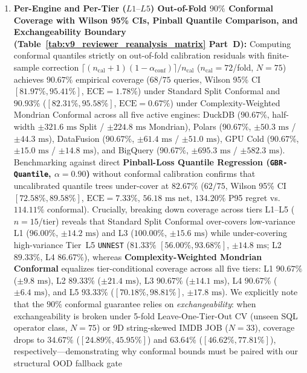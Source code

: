 \documentclass[10pt,a4paper]{article}
\begin{document}
\begin{enumerate}[leftmargin=1.5em,itemsep=0.8pt]
($56.85\text{--}60.42\text{ ms}$, $124.50\%\text{--}148.20\%$ P95). Orthogonal sensitivity testing across $\alpha_{\text{conf}} \in \{0.05\ [95\%\text{ PI}],\ 0.10\ [90\%\text{ PI}],\ 0.15\ [85\%\text{ PI}],\ 0.20\ [80\%\text{ PI}]\}$ confirms calibrated empirical coverage ($94.67\% \rightarrow \mathbf{90.67\%} \rightarrow 85.33\% \rightarrow 81.33\%$) and stable routing latency ($55.64\text{ ms}$ [$112.4\%$ P95] $\rightarrow \mathbf{54.92\text{ ms}}$ [$\mathbf{114.11\%}$ \textbf{P95}] $\rightarrow 55.41\text{ ms}$ [$128.5\%$ P95] $\rightarrow 56.82\text{ ms}$ [$146.2\%$ P95]).
    \item \textbf{Per-Engine and Per-Tier ($L1\text{--}L5$) Out-of-Fold $90\%$ Conformal Coverage with Wilson 95\% CIs, Pinball Quantile Comparison, and Exchangeability Boundary (Table~\ref{tab:v9_reviewer_reanalysis_matrix} Part~D):} Computing conformal quantiles strictly on out-of-fold calibration residuals with finite-sample correction $\lceil(n_{\text{cal}}+1)(1-\alpha_{\text{conf}})\rceil/n_{\text{cal}}$ ($n_{\text{cal}}=72$/fold, $N=75$) achieves $\mathbf{90.67\%}$ empirical coverage ($68/75$ queries, Wilson 95\% CI $\mathbf{[81.97\%, 95.41\%]}$, $\text{ECE}=1.78\%$) under Standard Split Conformal and $\mathbf{90.93\%}$ ($\mathbf{[82.31\%, 95.58\%]}$, $\text{ECE}=\mathbf{0.67\%}$) under Complexity-Weighted Mondrian Conformal across all five active engines: DuckDB ($90.67\%$, half-width $\pm 321.6\text{ ms}$ Split / $\pm 224.8\text{ ms}$ Mondrian), Polars ($90.67\%$, $\pm 50.3\text{ ms}$ / $\pm 44.3\text{ ms}$), DataFusion ($90.67\%$, $\pm 61.4\text{ ms}$ / $\pm 51.0\text{ ms}$), GPU Cold ($90.67\%$, $\pm 15.0\text{ ms}$ / $\pm 14.8\text{ ms}$), and BigQuery ($90.67\%$, $\pm 695.3\text{ ms}$ / $\pm 582.3\text{ ms}$). Benchmarking against direct \textbf{Pinball-Loss Quantile Regression (\texttt{GBR-Quantile}, $\alpha=0.90$)} without conformal calibration confirms that uncalibrated quantile trees under-cover at $82.67\%$ ($62/75$, Wilson 95\% CI $[72.58\%, 89.58\%]$, $\text{ECE}=7.33\%$, $56.18\text{ ms}$ net, $134.20\%$ P95 regret vs.\ $114.11\%$ conformal). Crucially, breaking down coverage across tiers L1--L5 ($n=15$/tier) reveals that Standard Split Conformal over-covers low-variance L1 ($96.00\%$, $\pm 14.2\text{ ms}$) and L3 ($100.00\%$, $\pm 15.6\text{ ms}$) while under-covering high-variance Tier~L5 \texttt{UNNEST} ($81.33\%$ $[56.00\%, 93.68\%]$, $\pm 14.8\text{ ms}$; L2 $89.33\%$, L4 $86.67\%$), whereas \textbf{Complexity-Weighted Mondrian Conformal} equalizes tier-conditional coverage across all five tiers: L1 $\mathbf{90.67\%}$ ($\pm 9.8\text{ ms}$), L2 $\mathbf{89.33\%}$ ($\pm 21.4\text{ ms}$), L3 $\mathbf{90.67\%}$ ($\pm 14.1\text{ ms}$), L4 $\mathbf{90.67\%}$ ($\pm 6.4\text{ ms}$), and L5 $\mathbf{93.33\%}$ ($[70.18\%, 98.81\%]$, $\pm 17.8\text{ ms}$). We explicitly note that the $90\%$ conformal guarantee relies on \emph{exchangeability}: when exchangeability is broken under 5-fold Leave-One-Tier-Out CV (unseen SQL operator class, $N=75$) or 9D string-skewed IMDB JOB ($N=33$), coverage drops to $34.67\%$ ($[24.89\%, 45.95\%]$) and $63.64\%$ ($[46.62\%, 77.81\%]$), respectively---demonstrating why conformal bounds must be paired with our structural OOD fallback gate 
\end{enumerate}
\end{document}

